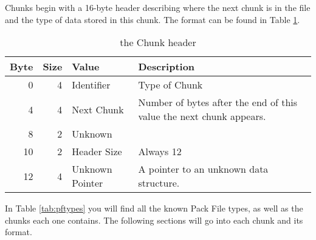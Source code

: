 Chunks begin with a 16-byte header describing where the next chunk is in the
file and the type of data stored in this chunk.  The format can be found in
Table \ref{tab:pfchunkheader}.

\begin{table}[htp]\begin{center}
	\caption{the Chunk header}
	\label{tab:pfchunkheader}
	
	\begin{tabular}{|r|r|l|p{2.5in}|}
		\hline
		\textbf{Byte} & \textbf{Size} & \textbf{Value} & \textbf{Description} \\
		\hline
		 0 & 4 & Identifier      & Type of Chunk \\
		\hline
		 4 & 4 & Next Chunk      & Number of bytes after the end of this value
		                           the next chunk appears. \\
		\hline
		 8 & 2 & Unknown         & \\
		\hline
		10 & 2 & Header Size     & Always 12 \\
		\hline
		12 & 4 & Unknown Pointer & A pointer to an unknown data structure. \\
		\hline
	\end{tabular}
\end{center}\end{table}

In Table \ref{tab:pftypes} you will find all the known Pack File types, as well
as the chunks each one contains.  The following sections will go into each chunk
and its format.

